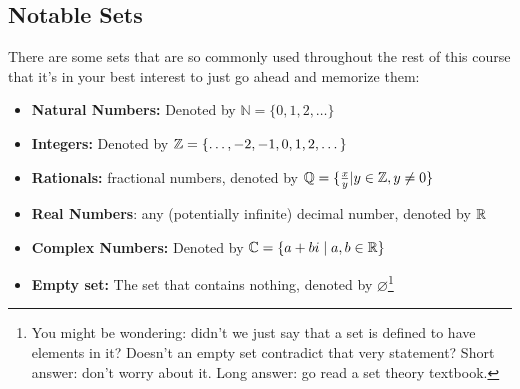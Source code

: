 \subsection{Notable Sets}
There are some sets that are so commonly used throughout the rest of this course that it's in your best 
interest to just go ahead and memorize them: 
\begin{itemize}
	\item \textbf{Natural Numbers:} Denoted by \(\mathbb N =  \{0, 1, 2, \dots \}  \)  
	\item \textbf{Integers:} Denoted by \( \mathbb Z = \{\dots, -2, -1, 0, 1, 2, \dots\}  \)
	\item \textbf{Rationals:} fractional numbers, denoted by \( \mathbb Q = \{\frac{x}{y} | y \in \mathbb Z, 
		y \neq 0 \}  \) 
	\item \textbf{Real Numbers}: any (potentially infinite) decimal number, denoted by \( \mathbb R \) 
	\item \textbf{Complex Numbers:} Denoted by \( \mathbb C = \{a + bi \mid a, b \in \mathbb R\} \)
	\item \textbf{Empty set:} The set that contains nothing, denoted by \( \varnothing \)\footnote{You might 
			be wondering: didn't we just say 
			that a set is defined to have elements in it? Doesn't an empty set contradict that very statement? 
		Short answer: don't worry about it. Long answer: go read a set theory textbook.} 
\end{itemize}
